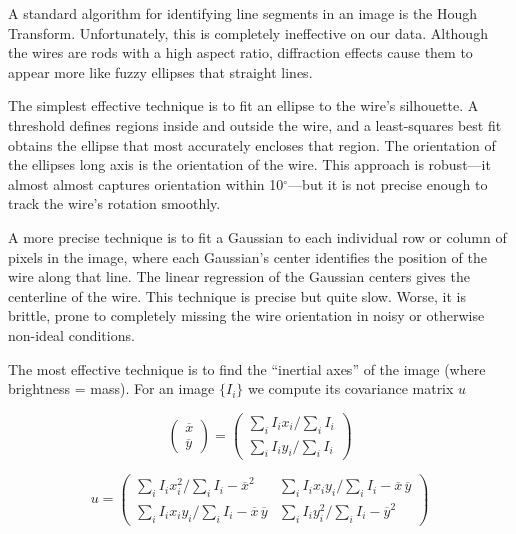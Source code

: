 A standard algorithm for identifying line segments in an image is the Hough Transform. Unfortunately, this is completely ineffective on our data. Although the wires are rods with a high aspect ratio, diffraction effects cause them to appear more like fuzzy ellipses that straight lines.

The simplest effective technique is to fit an ellipse to the wire's silhouette. A threshold defines regions inside and outside the wire, and a least-squares best fit obtains the ellipse that most accurately encloses that region. The orientation of the ellipses long axis is the orientation of the wire. This approach is robust---it almost almost captures orientation within 10$^\circ$---but it is not precise enough to track the wire's rotation smoothly.

A more precise technique is to fit a Gaussian to each individual row or column of pixels in the image, where each Gaussian's center identifies the position of the wire along that line. The linear regression of the Gaussian centers gives the centerline of the wire. This technique is precise but quite slow. Worse, it is brittle, prone to completely missing the wire orientation in noisy or otherwise non-ideal conditions.

The most effective technique is to find the ``inertial axes'' of the image (where brightness = mass). For an image $\{I_i\}$ we compute its covariance matrix $u$

\begin{equation}
\left( \begin{array}{c}
\overline{x} \\
\overline{y} \end{array} \right)
= \left( \begin{array}{c}
\sum_{i} I_i x_i / \sum_i I_i \\
\sum_{i} I_i y_i / \sum_i I_i \end{array} \right)
\end{equation}

\begin{equation}
u = \left( \begin{array}{cc}
\sum_{i} I_i x_i^2 / \sum_i I_i - \overline{x}^2 & \sum_{i} I_i x_i y_i / \sum_i I_i - \overline{x}\,\overline{y} \\
\sum_{i} I_i x_i y_i / \sum_i I_i - \overline{x}\,\overline{y} & \sum_{i} I_i y_i^2 / \sum_i I_i - \overline{y}^2\end{array} \right)
\end{equation}

